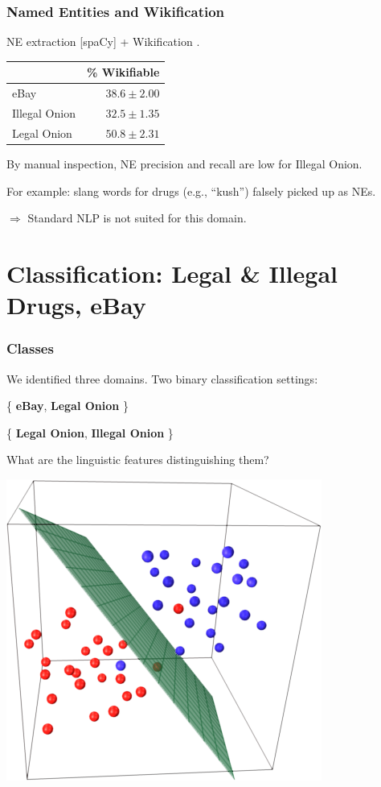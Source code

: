 \documentclass[t,xcolor={svgnames,table}]{beamer}
\begin{document}
\begin{frame}
	\frametitle{Named Entities and Wikification}
	
	NE extraction [spaCy] + Wikification \cite{bunescu2006using}.
	\vfill
	
	\begin{center}
	\begin{tabular}{l|r}
	 & \% Wikifiable\\
	 \hline
	eBay & $38.6 \pm2.00$\\
	Illegal Onion & $32.5 \pm1.35$\\
	Legal Onion & $50.8 \pm2.31$
	\end{tabular}
	\end{center}
	\vfill

	By manual inspection, NE precision and recall are low for Illegal Onion.
	
	For example: slang words for drugs (e.g., ``kush'') falsely picked up as NEs.	
	\vfill
	
	$\Rightarrow$ Standard NLP is not suited for this domain.
\end{frame}

\section{Classification: Legal \& Illegal Drugs, eBay}

\begin{frame}
	\frametitle{Classes}
	We identified three domains. Two binary classification settings:
	\begin{center}
	\{ \textbf{\color{yellow} eBay}, \textbf{\color{green} Legal Onion} \}
	\vfill
	
	\{ \textbf{\color{green} Legal Onion}, \textbf{\color{red} Illegal Onion} \}
	\end{center}
	\vfill
	\pause
	
	What are the linguistic features distinguishing them?
	\vfill
	
	\begin{center}
	\includegraphics[width=.3\textwidth]{svm.png}
	\end{center}
\end{frame}
\end{document}
